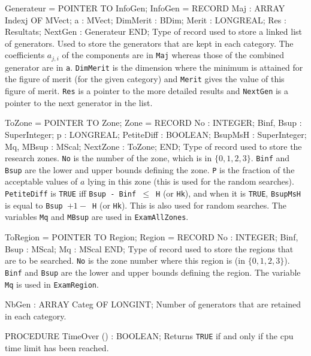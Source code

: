    Generateur = POINTER TO InfoGen;
   InfoGen    = RECORD
      Maj      : ARRAY Indexj OF MVect; 
      a        : MVect;
      DimMerit : BDim; 
      Merit    : LONGREAL;
      Res      : Resultats;
      NextGen  : Generateur
      END;
\endcode
 \tabb  Type of record used to store a linked list of generators.
   Used to store the generators that are kept in each category.
   The coefficients $a_{j,i}$ of the components are in {\tt Maj}
   whereas those of the combined generator are in {\tt a}.
   {\tt DimMerit} is the dimension where the minimum is attained for
   the figure of merit (for the given category) and {\tt Merit} gives
   the value of this figure of merit.
   {\tt Res} is a pointer to the more detailed results and
   {\tt NextGen} is a pointer to the next generator in the list.
 \endtabb
\code

   ToZone = POINTER TO Zone; 
   Zone   = RECORD
      No         : INTEGER; 
      Binf, Bsup : SuperInteger;
      p          : LONGREAL;
      PetiteDiff : BOOLEAN;
      BsupMsH    : SuperInteger;
      Mq, MBsup  : MScal;
      NextZone   : ToZone;
      END;
\endcode
 \tabb  Type of record used to store the research zones.
   {\tt No} is the number of the zone, which is in $\{0,1,2,3\}$.
   {\tt Binf} and {\tt Bsup} are the lower and upper bounds
   defining the zone.  
   {\tt P} is the fraction of the acceptable
   values of $a$ lying in this zone (this is used for the random searches).
   {\tt PetiteDiff} is {\tt TRUE} iff {\tt Bsup - Binf $\le$ H} (or {\tt Hk}),
   and when it is {\tt TRUE}, {\tt BsupMsH} is equal to 
   {\tt Bsup $+1-$ H} (or {\tt Hk}).  This is also used for random searches.
   The variables {\tt Mq} and {\tt MBsup} are used in {\tt ExamAllZones}.
  \endtabb
\code

   ToRegion = POINTER TO Region;
   Region   = RECORD
      No         : INTEGER;
      Binf, Bsup : MScal;
      Mq         : MScal
      END;
\endcode
 \tabb  Type of record used to store the regions that are to be searched.
   {\tt No} is the zone number where this region is (in $\{0,1,2,3\}$).
   {\tt Binf} and {\tt Bsup} are the lower and upper bounds
   defining the region.  
   The variable {\tt Mq} is  used in {\tt ExamRegion}.
  \endtabb
\code

      NbGen         : ARRAY Categ OF LONGINT;
\endcode
\tabbb
   Number of generators that are retained in each category.
\endtabbb
\code





PROCEDURE TimeOver () : BOOLEAN;
\endcode
 \tab 
   Returns {\tt TRUE} if and only if the cpu time limit has been reached.
 \endtab
\code

